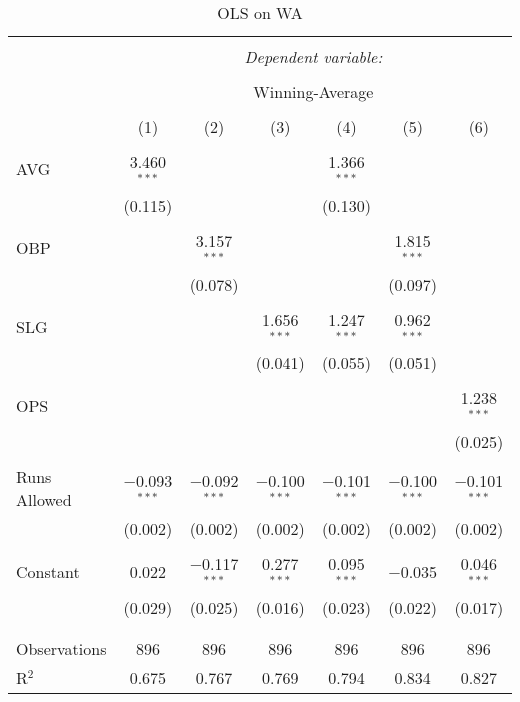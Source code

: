 
\begin{table}[!htbp] \centering
  \caption{OLS on WA}
  \label{}
  \scriptsize
\begin{tabular}{@{\extracolsep{5pt}}lcccccc}
\\[-1.8ex]\hline
\hline \\[-1.8ex]
 & \multicolumn{6}{c}{\textit{Dependent variable:}} \\
\cline{2-7}
\\[-1.8ex] & \multicolumn{6}{c}{Winning-Average} \\
\\[-1.8ex] & (1) & (2) & (3) & (4) & (5) & (6)\\
\hline \\[-1.8ex]
 AVG & 3.460$^{***}$ &  &  & 1.366$^{***}$ &  &  \\
  & (0.115) &  &  & (0.130) &  &  \\
  & & & & & & \\
 OBP &  & 3.157$^{***}$ &  &  & 1.815$^{***}$ &  \\
  &  & (0.078) &  &  & (0.097) &  \\
  & & & & & & \\
 SLG &  &  & 1.656$^{***}$ & 1.247$^{***}$ & 0.962$^{***}$ &  \\
  &  &  & (0.041) & (0.055) & (0.051) &  \\
  & & & & & & \\
 OPS &  &  &  &  &  & 1.238$^{***}$ \\
  &  &  &  &  &  & (0.025) \\
  & & & & & & \\
 Runs Allowed & $-$0.093$^{***}$ & $-$0.092$^{***}$ & $-$0.100$^{***}$ & $-$0.101$^{***}$ & $-$0.100$^{***}$ & $-$0.101$^{***}$ \\
  & (0.002) & (0.002) & (0.002) & (0.002) & (0.002) & (0.002) \\
  & & & & & & \\
 Constant & 0.022 & $-$0.117$^{***}$ & 0.277$^{***}$ & 0.095$^{***}$ & $-$0.035 & 0.046$^{***}$ \\
  & (0.029) & (0.025) & (0.016) & (0.023) & (0.022) & (0.017) \\
  & & & & & & \\
\hline \\[-1.8ex]
Observations & 896 & 896 & 896 & 896 & 896 & 896 \\
R$^{2}$ & 0.675 & 0.767 & 0.769 & 0.794 & 0.834 & 0.827 \\

\end{tabular}
\end{table}
